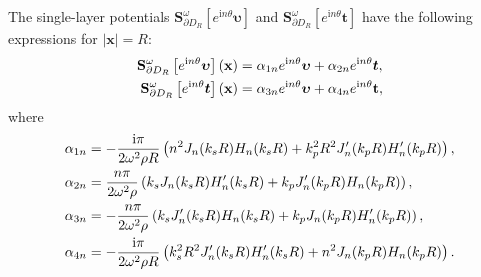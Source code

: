 \documentclass[10pt,a4paper]{amsart}
\newcommand{\bx}{\mathbf{x}}
\begin{document}
\begin{lem}\label{lem:sinlay}
	The single-layer potentials $\mathbf{S}_{\partial D_{R}}^{\omega}[e^{\mathrm{i}n\theta}\bm{\upsilon}]$ and $\mathbf{S}_{\partial D_{R}}^{\omega}[e^{\mathrm{i}n\theta}\bm{t}]$ have the following expressions  for $|\bx|=R$:
	\begin{align}
		\mathbf{S}_{\partial D_{R}}^{\omega}\left[e^{\mathrm{i} n \theta}\bm{\upsilon }\right](\bx)&=\alpha_{1 n} e^{\mathrm{i} n \theta} \bm{\upsilon}+\alpha_ {2 n} e^{\mathrm{i} n \theta} \bm{t},\label{equ:svt} \\ 
		\mathbf{S}_{\partial D_{R}}^{\omega}\left[e^{\mathrm{i} n \theta} \bm{t}\right](\bx)&=\alpha_{3 n} e^{\mathrm{i} n \theta} \bm{\upsilon}+\alpha_{4 n} e^{\mathrm{i} n \theta} \mathbf{t},\notag
	\end{align}
	where
	\begin{align}
		\alpha_{1n} &=-\frac{\mathrm{i}\pi}{2\omega^{2}\rho R}\left(n^{2}J_{n}(k_{s}R)H_{n}(k_{s}R)+k_{p}^{2}R^{2}J_{n}^{\prime}(k_{p}R)H_{n}^{\prime}(k_{p}R)\right), \notag\\
		\alpha_{2n} &=\frac{n\pi}{2\omega^{2}\rho}\left(k_{s}J_{n}(k_{s}R)H_{n}^{\prime}(k_{s}R)+k_{p}J_{n}^{\prime}(k_{p}R)H_{n}(k_{p}R)\right), \notag\\
		\alpha_{3n} &=-\frac{n\pi}{2\omega^{2}\rho}\left(k_{s}J_{n}^{\prime}(k_{s}R)H_{n}(k_{s}R)+k_{p}J_{n}(k_{p}R)H_{n}^{\prime}(k_{p}R)\right), \notag\\
		\alpha_{4n} &=-\frac{\mathrm{i}\pi}{2\omega^{2}\rho R}\left(k_{s}^{2}R^{2}J_{n}^{\prime}(k_{s}R)H_{n}^{\prime}(k_{s}R)+n^{2}J_{n}(k_{p}R)H_{n}(k_{p}R)\right). \notag
	\end{align}
	

\end{lem}
\end{document}
